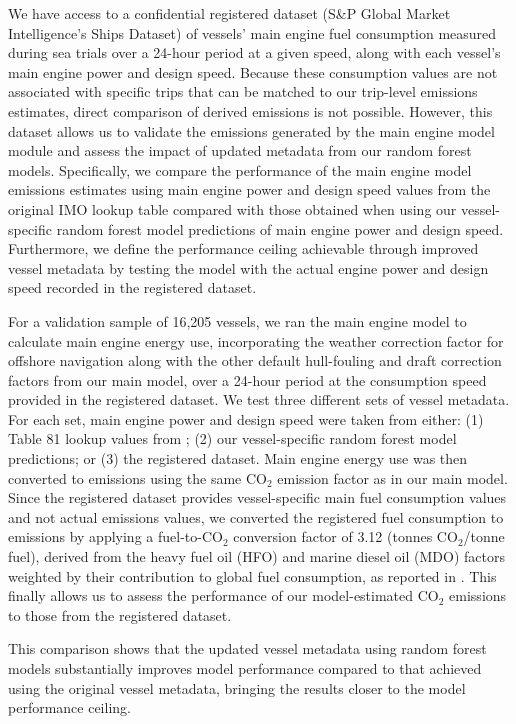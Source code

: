 \documentclass[lineno,pdflatex,sn-nature]{sn-jnl}
\begin{document}
We have access to a confidential registered dataset (S\&P Global Market Intelligence's Ships Dataset) of vessels' main engine fuel consumption measured during sea trials over a 24-hour period at a given speed, along with each vessel’s main engine power and design speed. Because these consumption values are not associated with specific trips that can be matched to our trip-level emissions estimates, direct comparison of derived emissions is not possible. However, this dataset allows us to validate the emissions generated by the main engine model module and assess the impact of updated metadata from our random forest models. Specifically, we compare the performance of the main engine model emissions estimates using main engine power and design speed values from the original IMO lookup table \cite{fourth2020greenhouse}  compared with those obtained when using our vessel-specific random forest model predictions of main engine power and design speed. Furthermore, we define the performance ceiling achievable through improved vessel metadata by testing the model with the actual engine power and design speed recorded in the registered dataset.

For a validation sample of 16,205 vessels, we ran the main engine model to calculate main engine energy use, incorporating the weather correction factor for offshore navigation along with the other default hull-fouling and draft correction factors from our main model, over a 24-hour period at the consumption speed provided in the registered dataset. We test three different sets of vessel metadata. For each set, main engine power and design speed were taken from either: (1) Table 81 lookup values from \cite{fourth2020greenhouse}; (2) our vessel-specific random forest model predictions; or (3) the registered dataset. Main engine energy use was then converted to emissions using the same CO$_{2}$ emission factor as in our main model. Since the registered dataset provides vessel-specific main fuel consumption values and not actual emissions values, we converted the registered fuel consumption to emissions by applying a fuel-to-CO$_{2}$ conversion factor of 3.12 (tonnes CO$_{2}$/tonne fuel), derived from the heavy fuel oil (HFO) and marine diesel oil (MDO) factors weighted by their contribution to global fuel consumption, as reported in \cite{fourth2020greenhouse}. This finally allows us to assess the performance of our model-estimated CO$_{2}$ emissions to those from the registered dataset.

This comparison shows that the updated vessel metadata using random forest models substantially improves model performance compared to that achieved using the original \cite{fourth2020greenhouse} vessel metadata, bringing the results closer to the model performance ceiling.
\end{document}
